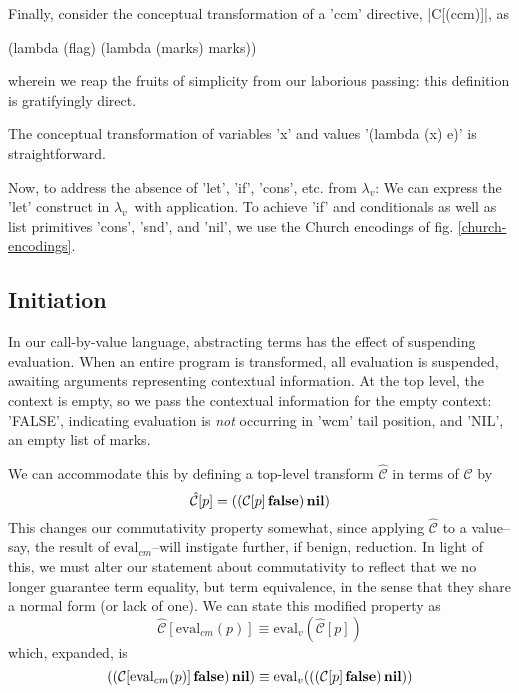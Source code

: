 \documentclass{llncs}
\newcommand{\lv}[0]{$\lambda_v$}
\newcommand{\app}[2]{(#1\,#2)}
\newcommand{\C}[1]{\mathcal{C}[#1]}
\newcommand{\Ch}[1]{\hat{\mathcal{C}}[#1]}
\newcommand{\evalv}[1]{\mathrm{eval}_v(#1)}
\newcommand{\evalcm}[1]{\mathrm{eval}_{cm}(#1)}
\begin{document}
Finally, consider the conceptual transformation of a \scheme'ccm' directive, \scheme|C[(ccm)]|, as
\begin{schemedisplay}
(lambda (flag)
  (lambda (marks)
    marks))
\end{schemedisplay}
wherein we reap the fruits of simplicity from our laborious passing: this definition is gratifyingly direct.

The conceptual transformation of variables \scheme'x' and values \scheme'(lambda (x) e)' is straightforward.

Now, to address the absence of \scheme'let', \scheme'if', \scheme'cons', etc. from \lv: We can express the \scheme'let' construct in \lv\ with application. To achieve \scheme'if' and conditionals as well as list primitives \scheme'cons', \scheme'snd', and \scheme'nil', we use the Church encodings of fig. \ref{church-encodings}.

\subsection{Initiation}

In our call-by-value language, abstracting terms has the effect of suspending evaluation. When an entire program is transformed, all evaluation is suspended, awaiting arguments representing contextual information. At the top level, the context is empty, so we pass the contextual information for the empty context: \scheme'FALSE', indicating evaluation is \emph{not} occurring in \scheme'wcm' tail position, and \scheme'NIL', an empty list of marks.

We can accommodate this by defining a top-level transform $\hat{\mathcal{C}}$ in terms of $\mathcal{C}$ by
\begin{equation}
\Ch{p}=\app{\app{\C{p}}{\false}}{\nil}
\end{equation}
This changes our commutativity property somewhat, since applying $\hat{\mathcal{C}}$ to a value--say, the result of $\mathrm{eval}_{cm}$--will instigate further, if benign, reduction. In light of this, we must alter our statement about commutativity to reflect that we no longer guarantee term equality, but term equivalence, in the sense that they share a normal form (or lack of one).
We can state this modified property as
\begin{equation}
\label{commutativity-property}
\Ch{\evalcm{p}}\equiv\evalv{\Ch{p}}
\end{equation}
which, expanded, is
\begin{equation}
\app{\app{\C{\evalcm{p}}}{\false}}{\nil}\equiv\evalv{\app{\app{\C{p}}{\false}}{\nil}}
\end{equation}
\end{document}

